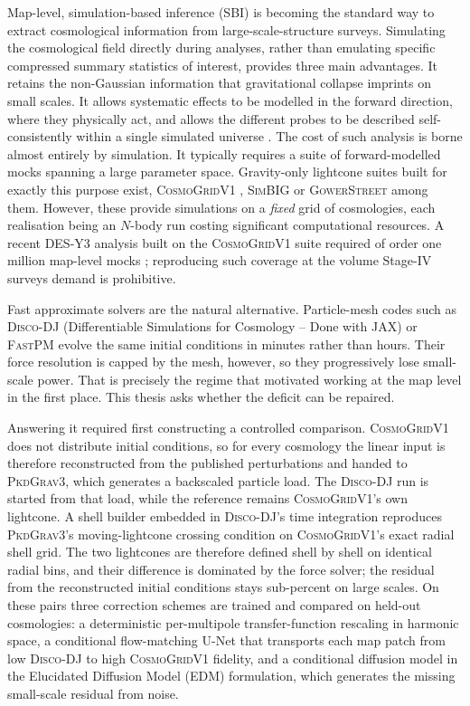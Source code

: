 \documentclass{report}
\begin{document}
Map-level, simulation-based inference (SBI) is becoming the standard way to extract cosmological information from large-scale-structure surveys. Simulating the cosmological field directly during analyses, rather than emulating specific compressed summary statistics of interest, provides three main advantages. It retains the non-Gaussian information that gravitational collapse imprints on small scales. It allows systematic effects to be modelled in the forward direction, where they physically act, and allows the different probes to be described self-consistently within a single simulated universe \cite{jeffrey_dark_2024, gatti_dark_2024, lemos_simbig_2023}. The cost of such analysis is borne almost entirely by simulation. It typically requires a suite of forward-modelled mocks spanning a large parameter space. Gravity-only lightcone suites built for exactly this purpose exist, \textsc{CosmoGridV1} \cite{kacprzak_cosmogridv1_2023}, \textsc{SimBIG} \cite{lemos_simbig_2023} or \textsc{GowerStreet} \cite{jeffrey_dark_2024} among them. However, these provide simulations on a \emph{fixed} grid of cosmologies, each realisation being an \mbox{$N$}-body run costing significant computational resources. A recent DES-Y3 analysis built on the \textsc{CosmoGridV1} suite required of order one million map-level mocks \cite{thomsen_dark_2026}; reproducing such coverage at the volume Stage-IV surveys demand is prohibitive.

Fast approximate solvers are the natural alternative. Particle-mesh codes such as \textsc{Disco-DJ} ({Differentiable Simulations for Cosmology -- Done with JAX}) \cite{list_disco-dj_2026} or \textsc{FastPM} \cite{feng_fastpm_2016} evolve the same initial conditions in minutes rather than hours. Their force resolution is capped by the mesh, however, so they progressively lose small-scale power. That is precisely the regime that motivated working at the map level in the first place. This thesis asks whether the deficit can be repaired.

Answering it required first constructing a controlled comparison. \textsc{CosmoGridV1} does not distribute initial conditions, so for every cosmology the linear input is therefore reconstructed from the published perturbations and handed to \textsc{PkdGrav3}, which generates a backscaled particle load. The \textsc{Disco-DJ} run is started from that load, while the reference remains \textsc{CosmoGridV1}'s own lightcone. A shell builder embedded in \textsc{Disco-DJ}'s time integration reproduces \textsc{PkdGrav3}'s moving-lightcone crossing condition on \textsc{CosmoGridV1}'s exact radial shell grid. The two lightcones are therefore defined shell by shell on identical radial bins, and their difference is dominated by the force solver; the residual from the reconstructed initial conditions stays sub-percent on large scales. On these pairs three correction schemes are trained and compared on held-out cosmologies: a deterministic per-multipole transfer-function rescaling in harmonic space, a conditional flow-matching U-Net that transports each map patch from low \textsc{Disco-DJ} to high \textsc{CosmoGridV1} fidelity, and a conditional diffusion model in the Elucidated Diffusion Model (EDM) formulation, which generates the missing small-scale residual from noise.
\end{document}
